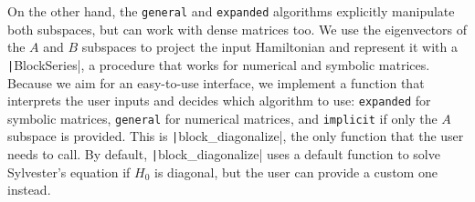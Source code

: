 On the other hand, the \texttt{general} and \texttt{expanded} algorithms explicitly
manipulate both subspaces, but can work with dense matrices too.
We use the eigenvectors of the $A$ and $B$ subspaces to project the input
Hamiltonian and represent it with a \texttt|BlockSeries|, a procedure that works for
numerical and symbolic matrices.
Because we aim for an easy-to-use interface, we implement a function that
interprets the user inputs and decides which algorithm to use: \texttt{expanded}
for symbolic matrices, \texttt{general} for numerical matrices, and \texttt{implicit} if
only the $A$ subspace is provided.
This is \texttt|block_diagonalize|, the only function that the user
needs to call.
By default, \texttt|block_diagonalize| uses a default function to
solve Sylvester's equation if $H_0$ is diagonal, but the user can provide a
custom one instead.
